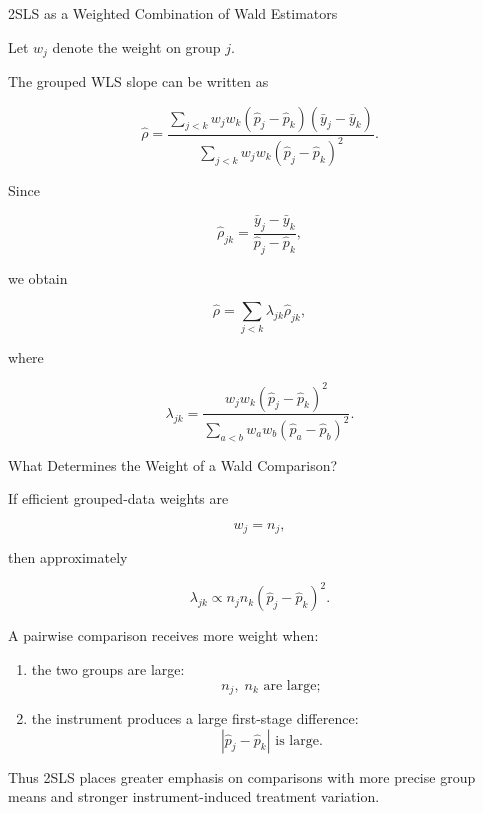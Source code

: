 \documentclass[aspectratio=169]{beamer}
\begin{document}
\begin{frame}{2SLS as a Weighted Combination of Wald Estimators}

Let \(w_j\) denote the weight on group \(j\).

The grouped WLS slope can be written as

\[
\hat\rho
=
\frac{
\sum_{j<k}
w_jw_k
(\hat p_j-\hat p_k)
(\bar y_j-\bar y_k)
}{
\sum_{j<k}
w_jw_k
(\hat p_j-\hat p_k)^2
}.
\]

Since

\[
\hat\rho_{jk}
=
\frac{
\bar y_j-\bar y_k
}{
\hat p_j-\hat p_k
},
\]

we obtain

\[
\boxed{
\hat\rho
=
\sum_{j<k}
\lambda_{jk}\hat\rho_{jk},
}
\]

where

\[
\lambda_{jk}
=
\frac{
w_jw_k(\hat p_j-\hat p_k)^2
}{
\sum_{a<b}
w_aw_b(\hat p_a-\hat p_b)^2
}.
\]

\end{frame}

\begin{frame}{What Determines the Weight of a Wald Comparison?}

If efficient grouped-data weights are

\[
w_j=n_j,
\]

then approximately

\[
\boxed{
\lambda_{jk}
\propto
n_jn_k
(\hat p_j-\hat p_k)^2.
}
\]

A pairwise comparison receives more weight when:

\begin{enumerate}
    \item the two groups are large:
    \[
    n_j,\;n_k \text{ are large};
    \]

    \item the instrument produces a large first-stage difference:
    \[
    |\hat p_j-\hat p_k|
    \text{ is large}.
    \]
\end{enumerate}

\vspace{0.3cm}

Thus 2SLS places greater emphasis on comparisons with more precise group means and stronger instrument-induced treatment variation.

\end{frame}
\end{document}
